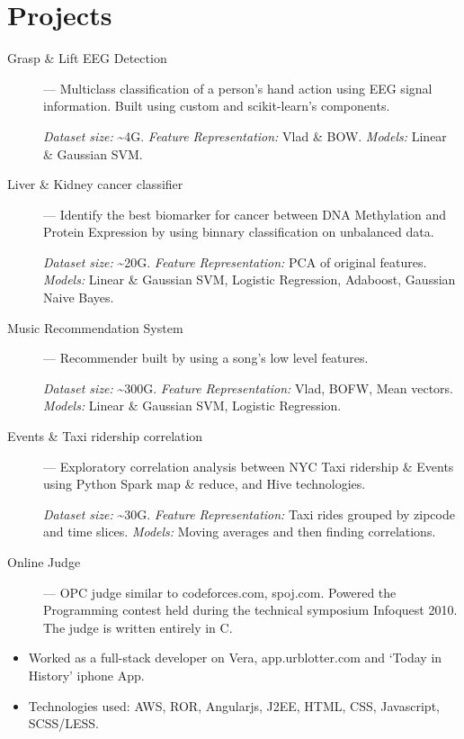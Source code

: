 \documentclass{resume}
\begin{document}
\section{Projects}
  \begin{description}
    \item[Grasp \& Lift EEG Detection] --- Multiclass classification of a person's hand action using EEG signal information.  Built using custom and scikit-learn's components.
      \par \textit{Dataset size:} \~{}4G.  \textit{Feature Representation:} Vlad \& BOW\@.  \textit{Models:} Linear \& Gaussian SVM\@.
    \item[Liver \& Kidney cancer classifier] --- Identify the best biomarker for cancer between DNA Methylation and Protein Expression by using binnary classification on unbalanced data.
      \par \textit{Dataset size:} \~{}20G.  \textit{Feature Representation:} PCA of original features.  \textit{Models:} Linear \& Gaussian SVM\@, Logistic Regression, Adaboost, Gaussian Naive Bayes.
    \item[Music Recommendation System] --- Recommender built by using a song's low level features.
      \par \textit{Dataset size:} \~{}300G.  \textit{Feature Representation:} Vlad, BOFW, Mean vectors.  \textit{Models:} Linear \& Gaussian SVM, Logistic Regression.
    \item[Events \& Taxi ridership correlation] --- Exploratory correlation analysis between NYC Taxi ridership \& Events using Python Spark map \& reduce, and Hive technologies.
      \par \textit{Dataset size:} \~{}30G. \textit{Feature Representation:} Taxi rides grouped by zipcode and time slices.  \textit{Models:} Moving averages and then finding correlations.
    \item[Online Judge] --- OPC judge similar to codeforces.com, spoj.com.  Powered the Programming contest held during the technical symposium Infoquest 2010.  The judge is written entirely in C.
  \end{description}


\begin{itemize} \itemsep1pt \parskip0pt
  \item Worked as a full-stack developer on Vera, app.urblotter.com and `Today in History' iphone App.
  \item Technologies used: AWS, ROR, Angularjs, J2EE, HTML, CSS, Javascript, SCSS/LESS\@.
\end{itemize}
\end{document}
